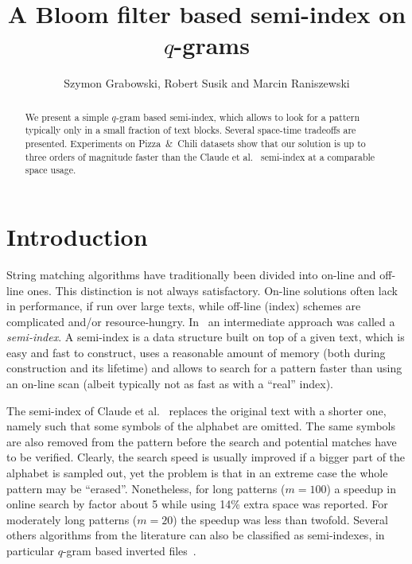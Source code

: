 \documentclass{llncs}
\begin{document}
\title{A Bloom filter based semi-index on $q$-grams}

\author{Szymon Grabowski,
Robert Susik
and
Marcin Raniszewski
}


\maketitle


\begin{abstract}
We present a simple $q$-gram based semi-index, which allows to look for 
a pattern typically only in a small fraction of text blocks.
Several space-time tradeoffs are presented. 
Experiments on Pizza~\&~Chili datasets show that our solution 
is up to three orders of magnitude faster than the 
Claude et al.~\cite{CNPSTjda10} semi-index at a comparable space usage.
\end{abstract}

\section{Introduction}
\noindent 
String matching algorithms have traditionally been divided 
into on-line and off-line ones.
This distinction is not always satisfactory.
On-line solutions often lack in performance, if run over large 
texts, while off-line (index) schemes are complicated and/or resource-hungry.
In~\cite{CNPSTjda10} an intermediate approach was called a {\em semi-index}.
A semi-index is a data structure built on top of a given text, 
which is easy and fast to construct, uses a reasonable amount of memory 
(both during construction and its lifetime) and allows to search for a 
pattern faster than using an on-line scan (albeit typically not as fast 
as with a ``real'' index).

The semi-index of Claude et al.~\cite{CNPSTjda10} replaces the original text 
with a shorter one, namely such that some symbols of the alphabet are omitted.
The same symbols are also removed from the pattern before the search 
and potential matches have to be verified.
Clearly, the search speed is usually improved if a bigger part of the alphabet 
is sampled out, yet the problem is that in an extreme case the whole pattern 
may be ``erased''.  
Nonetheless, for long patterns ($m = 100$) a speedup in online search 
by factor about 5 while using 14\% extra space was reported. 
For moderately long patterns ($m = 20$) the speedup was less than twofold.
Several others algorithms from the literature can also be classified 
as semi-indexes, in particular $q$-gram based inverted files~\cite{PST2006}.
\end{document}
